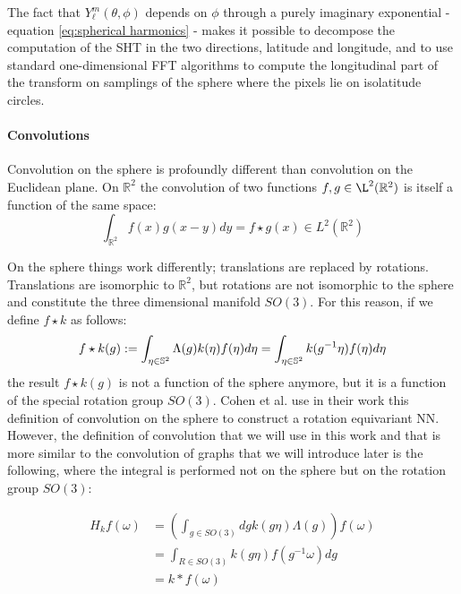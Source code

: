 The fact that $Y_\ell^m(\theta, \phi)$ depends on $\phi$ through a purely imaginary exponential - equation \ref{eq:spherical harmonics} - makes it possible to decompose the computation of the SHT in the two directions, latitude and longitude, and to use standard one-dimensional FFT algorithms to compute the longitudinal part of the transform on samplings of the sphere where the pixels lie on isolatitude circles.

\paragraph{Convolutions}
Convolution on the sphere is profoundly different than convolution on the Euclidean plane. On $\mathbb R^2$ the convolution of two functions $f, g \in \L^2(\mathbb R^2)$ is itself a function of the same space:
$$ \int_{\mathbb R^2} f(x)g(x-y)dy = f\star g(x) \in L^2(\mathbb R^2)$$

On the sphere things work differently; translations are replaced by rotations. Translations are isomorphic to $\mathbb R^2$, but rotations are not isomorphic to the sphere and constitute the three dimensional manifold $SO(3)$. For this reason, if we define $f\star k$ as follows:
\begin{equation} \label{eq:cohen convolution}
f\star k(g) := \int_{\eta \in \mathbb S^2} \Lambda(g)k( \eta) f(\eta) d\eta=\int_{\eta \in \mathbb S^2} k(g^{-1} \eta) f(\eta) d\eta\\ 
\end{equation}
the result $f\star k(g)$ is not a function of the sphere anymore, but it is a function of the special rotation group $SO(3)$. Cohen et al. \cite{SCNN} use in their work this definition of convolution on the sphere to construct a rotation equivariant NN. However, the definition of convolution that we will use in this work and that is more similar to the convolution of graphs that we will introduce later is the following, where the integral is performed not on the sphere but on the rotation group $SO(3)$:

\begin{equation}\label{eq:convolution}
	\begin{aligned} H_{k} f(\omega) &=\left(\int_{g \in S O(3)} d g k(g \eta) \Lambda(g)\right) f(\omega) \\ &=\int_{R \in S O(3)} k(g \eta) f\left(g^{-1} \omega\right) d g \\ &=k * f(\omega) \end{aligned}
\end{equation}

